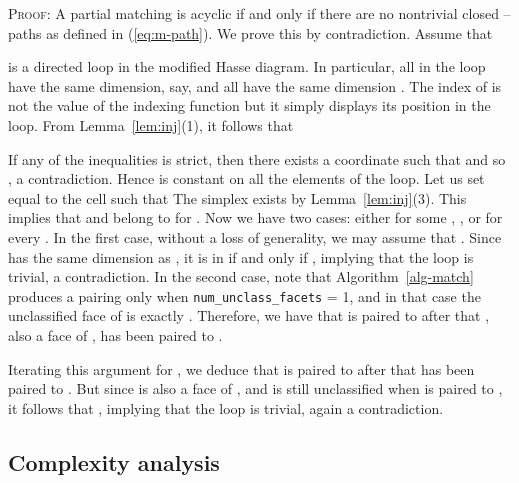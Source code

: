 \documentclass[12pt]{article}
\newenvironment{proof}{\noindent\textsc{Proof: }}{\hfill\par\medskip\par}
\begin{document}
\begin{proof}
A partial matching is acyclic if and only if there are no nontrivial closed --paths as defined in (\ref{eq:m-path}). We prove this by contradiction. Assume that

is a directed loop in the modified Hasse diagram. In particular, all  in the loop have the same dimension, say,  and all  have the same dimension .
The index  of  is not the value of the indexing function  but it simply displays its position in the loop.
From Lemma~\ref{lem:inj}(1), it follows that

If any of the inequalities  is strict, then there exists a coordinate  such that
 and so , a contradiction. Hence  is constant on all the elements of the loop.
Let us set  equal to the cell such that 
The simplex  exists  by Lemma~\ref{lem:inj}(3). This implies that  and  belong to  for . Now we have two cases: either
 for some , , or  for every . In the first case, without a loss of generality, we may assume that .  Since  has the same dimension as , it is  in  if and only if , implying that the loop is trivial, a contradiction.
In the second case, note that Algorithm~\ref{alg-match} produces a pairing  only when \texttt{{num}\_{unclass}\_{facets}} = 1, and in that case the unclassified face of  is exactly . Therefore, we have that  is paired to  after that ,  also a face of , has been paired to .

Iterating this argument for , we deduce that  is paired to  after that  has been paired to . But since  is also a face of , and  is still unclassified when  is paired to , it follows that , implying that the loop is trivial, again a contradiction.

\end{proof}

\subsection{Complexity analysis}
\label{sec:complexity}
\end{document}

